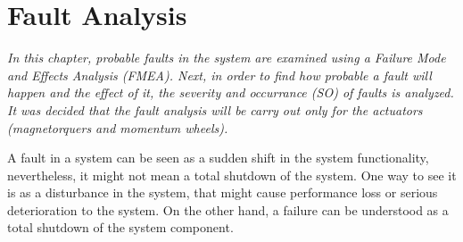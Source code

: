 \chapter{Fault  Analysis }
\textit{In this chapter, probable faults in the system are examined using a  Failure Mode and Effects Analysis (FMEA). Next, in order to find how probable a fault will happen and the effect of it, the severity and occurrance (SO)  of faults is analyzed. It was decided that the fault analysis will be carry out only for the actuators (magnetorquers and momentum wheels).}


A fault in a system can be seen as a sudden shift in the system functionality, nevertheless, it might not mean a total shutdown of the system. One way to see it is as a disturbance in the system, that might cause performance loss or serious deterioration to the system. On the other hand, a failure can be understood as a total shutdown of the system component. 

